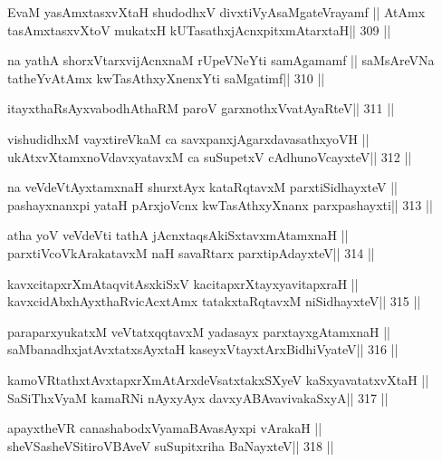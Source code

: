 \begin{shl}
EvaM yasAmxtasxvXtaH shudodhxV divxtiVyAsaMgateVrayamf ||
AtAmx tasAmxtasxvXtoV mukatxH kUTasathxjAcnxpitxmAtarxtaH\hfill || 309 ||
\end{shl}

\begin{shl}
na yathA shorxVtarxvijAcnxnaM rUpeVNeYti samAgamamf ||
saMsAreVNa tatheYvA\s\s tAmx kwTasAthxyXnenxYti saMgatimf\hfill || 310 ||
\end{shl}

\begin{shl}
itayxthaRsAyxvabodhAthaRM paroV garxnothxV\s vatAyaRteV\hfill || 311 ||
\end{shl}

\begin{shl}
vishudidhxM vayxtireVkaM ca savxpanxjAgarxdavasathxyoVH ||
ukAtxvX\s\s tamxnoV\s davxyatavxM ca suSupetxV cAdhunoVcayxteV\hfill || 312 ||
\end{shl}

\begin{shl}
na veVdeVtAyxtamxnaH shurxtAyx kataRqtavxM parxtiSidhayxteV ||
pashayxnanxpi yataH pArxjoVcnx kwTasAthxyXnanx parxpashayxti\hfill || 313 ||
\end{shl}

\begin{shl}
atha yoV veVdeVti tathA jAcnxtaqsAkiSxtavxmAtamxnaH ||
parxtiVcoV\s kArakatavxM naH savaRtarx parxtipAdayxteV\hfill || 314 ||
\end{shl}

\begin{shl}
kavxcitapxrXmAtaqvitAsxkiSxV kacitapxrXtayxyavitapxraH ||
kavxcidAbxhAyxthaRvicAcx\s\s tAmx tatakxtaRqtavxM niSidhayxteV\hfill || 315 ||
\end{shl}

\begin{shl}
paraparxyukatxM veVtatxqqtavxM yadasayx parxtayxgAtamxnaH ||
saMbanadhxjatAvxtatxsAyxtaH kaseyxVtayxtArxBidhiVyateV\hfill || 316 ||
\end{shl}

\begin{shl}
kamoVRtathxtAvxtapxrXmAtArxdeVsatxtakxSXyeV kaSxyavatatxvXtaH ||
SaSiThxVyaM kamaRNi nAyxyAyx davxyABAvavivakaSxyA\hfill || 317 ||
\end{shl}

\begin{shl}
apayxtheVR canashabodxV\s yamaBAvasAyxpi vArakaH ||
sheVSasheVSitiroVBAveV suSupitxriha BaNayxteV\hfill || 318 ||
\end{shl}

